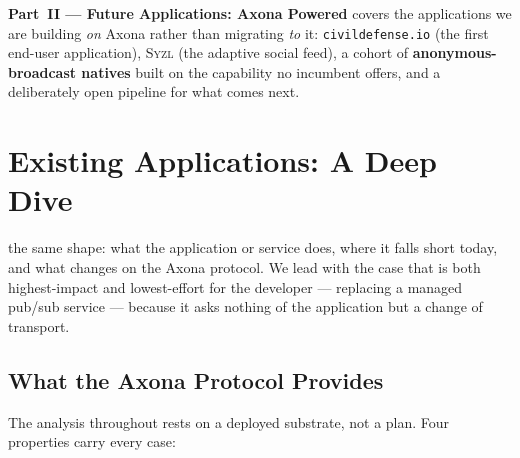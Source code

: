 \documentclass[nobib]{tufte-handout}
\begin{document}
\textbf{Part~II --- Future Applications: Axona Powered} covers the
applications we are building \emph{on} Axona rather than migrating
\emph{to} it: \texttt{civildefense.io} (the first end-user
application), \textsc{Syzl} (the adaptive social feed), a cohort of
\textbf{anonymous-broadcast natives} built on the capability no incumbent
offers, and a deliberately open pipeline for what comes next.


\section{Existing Applications: A Deep Dive}

 the same shape: what the application or
service does, where it falls short today, and what changes on the Axona
protocol. We lead with the case that is both highest-impact and
lowest-effort for the developer --- replacing a managed pub/sub service
--- because it asks nothing of the application but a change of
transport.

\subsection{What the Axona Protocol Provides}

The analysis throughout rests on a deployed substrate, not a plan. Four
properties carry every case:
\end{document}

